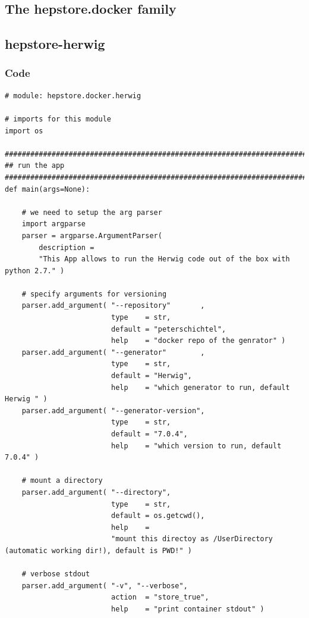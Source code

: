 \documentclass[aps,prd,11pt,tightenlines,superscriptaddress,nofootinbib,preprintnumbers,notitlepage]{revtex4-1}
\begin{document}
\begin{appendix}

  \section{The hepstore.docker family}

  \subsection{hepstore-herwig}

  \subsubsection{Code}

  \begin{lstlisting}
# module: hepstore.docker.herwig

# imports for this module
import os

############################################################################
## run the app
############################################################################
def main(args=None):

    # we need to setup the arg parser
    import argparse
    parser = argparse.ArgumentParser(
        description =
        "This App allows to run the Herwig code out of the box with python 2.7." )
    
    # specify arguments for versioning
    parser.add_argument( "--repository"       ,
                         type    = str,
                         default = "peterschichtel",
                         help    = "docker repo of the genrator" )
    parser.add_argument( "--generator"        ,
                         type    = str,
                         default = "Herwig",
                         help    = "which generator to run, default Herwig " )
    parser.add_argument( "--generator-version",
                         type    = str,
                         default = "7.0.4",
                         help    = "which version to run, default 7.0.4" )
    
    # mount a directory
    parser.add_argument( "--directory",
                         type    = str,
                         default = os.getcwd(),
                         help    =
                         "mount this directoy as /UserDirectory (automatic working dir!), default is PWD!" )

    # verbose stdout
    parser.add_argument( "-v", "--verbose",
                         action  = "store_true",
                         help    = "print container stdout" )
    

\end{lstlisting}
\end{appendix}
\end{document}
